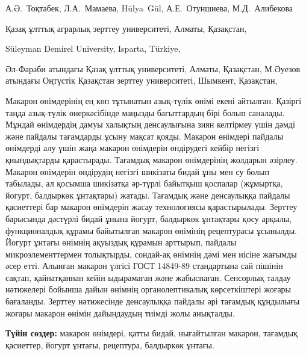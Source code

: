 
\begin{header}

А.Ә.~Тоқтабек\envelope,
Л.А.~Мамаева,
Hülya~Gül,
А.Е.~Отуншиева,
М.Д.~Алибекова
\end{header}

\begin{affil}
Қазақ ұлттық аграрлық зерттеу университеті, Алматы, Қазақстан,

Süleyman Demirel University, Isparta, Türkiye,

Әл-Фараби атындағы Қазақ ұлттық университеті, Алматы, Қазақстан, М.Әуезов атындағы Оңтүстік Қазақстан зерттеу университеті, Шымкент, Қазақстан,

\end{affil}

Макарон өнімдерінің ең көп тұтынатын азық-түлік өнімі екені айтылған.
Қазіргі таңда азық-түлік өнеркәсібінде маңызды бағыттардың бірі болып
саналады. Мұндай өнімдердің дамуы халықтың денсаулығына зиян келтірмеу
үшін дәмді және пайдалы тағамдарды ұсыну мақсат қояды. Макарон өнімдері
пайдалы өнімдерді алу үшін жаңа макарон өнімдерін өндірудегі кейбір
негізгі қиындықтарды қарастырады. Тағамдық макарон өнімдерінің жолдарын
әзірлеу. Макарон өнімдерін өндірудің негізгі шикізаты бидай ұны мен су
болып табылады, ал қосымша шикізатқа әр-түрлі байытқыш қоспалар
(жұмыртқа, йогурт, балдыркөк ұнтақтары) жатады. Тағамдық және
денсаулыққа пайдалы қасиеттері бар макарон өнімдерін жасау технологиясы
қарастырылады. Зерттеу барысында дәстүрлі бидай ұнына йогурт, балдыркөк
ұнтақтары қосу арқылы, функционалдық құрамы байытылған макарон өнімінің
рецептурасы ұсынылды. Йогурт ұнтағы өнімнің ақуыздық құрамын арттырып,
пайдалы микроэлементтермен толықтырды, сондай-ақ өнімнің дәмі мен иісіне
жағымды әсер етті. Алынған макарон үлгісі ГОСТ 14849-89 стандартына сай
пішінін сақтап, қайнатқаннан кейін ыдырамаған және жабыспаған. Сенсорлық
талдау нәтижелері бойынша дайын өнімнің органолептикалық көрсеткіштері
жоғары бағаланды. Зерттеу нәтижесінде денсаулыққа пайдалы әрі тағамдық
құндылығы жоғары макарон өнімін дайындаудың тиімді жолы анықталды.

{\bfseries Түйін сөздер:} макарон өнімдері, қатты бидай, нығайтылған
макарон, тағамдық қасиеттер, йогурт ұнтағы, рецептура, балдыркөк ұнтағы.


